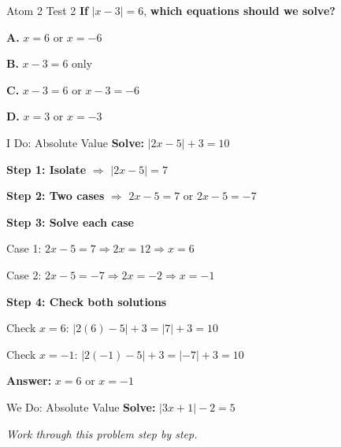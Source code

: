 \documentclass[12pt]{beamer}
\begin{document}
\begin{frame}{Atom 2 Test 2}
\textbf{If} $|x - 3| = 6$, \textbf{which equations should we solve?}

\vspace{1cm}

\textbf{A.} $x = 6$ or $x = -6$

\textbf{B.} $x - 3 = 6$ only

\textbf{C.} $x - 3 = 6$ or $x - 3 = -6$ \hfill {}

\textbf{D.} $x = 3$ or $x = -3$
\end{frame}

\begin{frame}{I Do: Absolute Value}
\textbf{Solve:} $|2x - 5| + 3 = 10$

\pause
\vspace{0.3cm}

\textbf{Step 1: Isolate} $\Rightarrow$ $|2x - 5| = 7$

\pause
\vspace{0.3cm}

\textbf{Step 2: Two cases} $\Rightarrow$ $2x - 5 = 7$ or $2x - 5 = -7$

\pause
\vspace{0.3cm}

\textbf{Step 3: Solve each case}

\pause
Case 1: $2x - 5 = 7 \Rightarrow 2x = 12 \Rightarrow x = 6$

\pause
Case 2: $2x - 5 = -7 \Rightarrow 2x = -2 \Rightarrow x = -1$

\pause
\vspace{0.3cm}

\textbf{Step 4: Check both solutions}

\pause
Check $x = 6$: $|2(6) - 5| + 3 = |7| + 3 = 10$ \checkmark

\pause
Check $x = -1$: $|2(-1) - 5| + 3 = |-7| + 3 = 10$ \checkmark

\pause
\vspace{0.3cm}

\Large \textbf{Answer:} $x = 6$ or $x = -1$
\end{frame}

\begin{frame}{We Do: Absolute Value}
\textbf{Solve:} $|3x + 1| - 2 = 5$

\vspace{2cm}

\textit{Work through this problem step by step.}
\end{frame}
\end{document}
